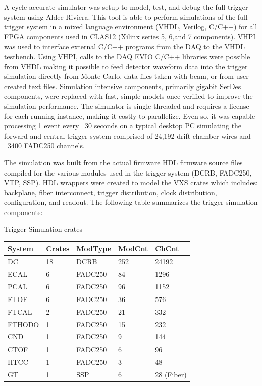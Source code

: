A cycle accurate simulator was setup to model, test, and debug the full trigger system using Aldec Riviera. This tool is able to perform simulations of the full trigger system in a mixed language environment (VHDL, Verilog, C/C++) for all FPGA components used in CLAS12 (Xilinx series 5, 6,and 7 components). VHPI was used to interface external C/C++ programs from the DAQ to the VHDL testbench. Using VHPI, calls to the DAQ EVIO C/C++ libraries were possible from VHDL making it possible to feed detector waveform data into the trigger simulation directly from Monte-Carlo, data files taken with beam, or from user created text files. Simulation intensive components, primarily gigabit SerDes components, were replaced with fast, simple models once verified to improve the simulation performance. The simulator is single-threaded and requires a license for each running instance, making it costly to parallelize. Even so, it was capable processing 1 event every ~30 seconds on a typical desktop PC simulating the forward and central trigger system comprised of 24,192 drift chamber wires and ~3400 FADC250 channels.

The simulation was built from the actual firmware HDL firmware source files compiled for the various modules used in the trigger system (DCRB, FADC250, VTP, SSP). HDL wrappers were created to model the VXS crates which includes: backplane, fiber interconnect, trigger distribution, clock distribution, configuration, and readout. The following table summarizes the trigger simulation components:

\begin{center}
	Trigger Simulation crates\\
	\begin{tabular}{| l | l | l | l | l |}
		\hline \hline
		System		& Crates	& ModType	& ModCnt	& ChCnt		\\
		\hline
		DC		& 18		& DCRB		& 252		& 24192		\\
		ECAL		& 6		& FADC250	& 84		& 1296	 	\\
		PCAL		& 6		& FADC250	& 96		& 1152	 	\\
		FTOF		& 6		& FADC250	& 36		& 576	 	\\
		FTCAL		& 2		& FADC250	& 21		& 332	 	\\
		FTHODO		& 1		& FADC250	& 15		& 232	 	\\
		CND		& 1		& FADC250	& 9		& 144	 	\\
		CTOF		& 1		& FADC250	& 6		& 96	 	\\
		HTCC		& 1		& FADC250	& 3		& 48	 	\\
		GT		& 1		& SSP		& 6		& 28 (Fiber)	\\
		\hline \hline
	\end{tabular}
\end{center}


